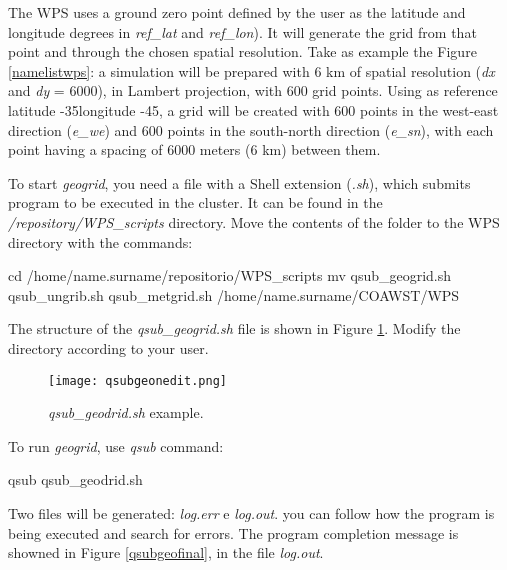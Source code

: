 \bigskip

\noindent The WPS uses a ground zero point defined by the user as the latitude and longitude degrees in \textit{ref\_lat} and \textit{ref\_lon}).
It will generate the grid from that point and through the chosen spatial resolution. Take as example the Figure
\textcolor{bleu_cite}{\ref{namelistwps}}: a simulation will be prepared with 6 km of spatial resolution (\textit{dx} and \textit{dy} = 6000),
in Lambert projection, with 600 grid points. Using as reference latitude -35\degree longitude -45\degree, a grid will be created with 
600 points in the west-east direction (\textit{e\_we}) and 600 points in the south-north direction (\textit{e\_sn}), with each
point having a spacing of 6000 meters (6 km) between them.
\bigskip

\noindent To start \textit{geogrid}, you need a file with a Shell extension (\textit{.sh}), which submits program to be executed in the cluster.
 It can be found in the \textit{/repository/WPS\_scripts} directory. Move the contents of the folder to the WPS directory with the commands:
\bigskip

\begin{bashcode}[fontsize=\footnotesize]
cd /home/name.surname/repositorio/WPS_scripts
mv qsub_geogrid.sh qsub_ungrib.sh qsub_metgrid.sh /home/name.surname/COAWST/WPS
\end{bashcode}
\bigskip

\noindent The structure of the \textit{qsub\_geogrid.sh} file is shown in Figure \textcolor{bleu_cite}{\ref{qsubgeonedit}}. 
Modify the directory according to your user.
\bigskip

\begin{figure}[H]
    \centering
    \texttt{[image: qsubgeonedit.png]}
    \caption{\textit{qsub\_geodrid.sh} example.}
    \label{qsubgeonedit}
\end{figure}
\bigskip

\noindent To run \textit{geogrid}, use \textit{qsub} command:
\bigskip

\begin{bashcode}
qsub qsub_geodrid.sh
\end{bashcode}
\bigskip

\noindent Two files will be generated: \textit{log.err} e \textit{log.out}. you can follow how the program is being executed and search for errors. 
The program completion message is showned in Figure \textcolor{bleu_cite}{\ref{qsubgeofinal}}, in the file \textit{log.out}.

